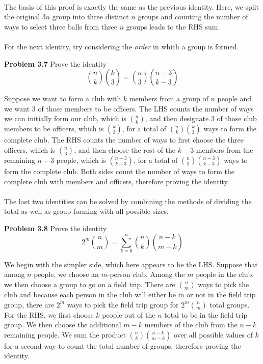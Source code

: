 \documentclass[11pt]{scrartcl}
\begin{document}
\\
\noindent
The basis of this proof is exactly the same as the previous identity. Here, we split the original $3n$ group into three distinct $n$ groups and counting the number of ways to select three balls from three $n$ groups leads to the RHS sum. \\
\\
\noindent 
For the next identity, try considering the \textit{order} in which a group is formed. 
\\
\begin{tcolorbox}
\textbf{Problem 3.7} Prove the identity
$${n \choose k}{k \choose 3}={n \choose 3}{n-3 \choose k-3}$$
\end{tcolorbox}
\noindent
Suppose we want to form a club with $k$ members from a group of $n$ people and we want 3 of those members to be officers. The LHS counts the number of ways we can initially form our club, which is ${{n \choose k}}$, and then designate 3 of those club members to be officers, which is ${{k \choose 3}}$, for a total of ${n \choose k}{k \choose 3}$ ways to form the complete club. The RHS counts the number of ways to first choose the three officers, which is $n \choose 3$, and then choose the rest of the $k-3$ members from the remaining $n-3$ people, which is ${{{n-3} \choose {k-3}}}$, for a total of ${n \choose 3}{n-3 \choose k-3}$ ways to form the complete club. Both sides count the number of ways to form the complete club with members and officers, therefore proving the identity. \\
\\
The last two identities can be solved by combining the methods of dividing the total as well as group forming with all possible sizes. 
\\
\begin{tcolorbox}
\textbf{Problem 3.8} Prove the identity 
$$2^m{n \choose m}=\sum_{k=0}^{n}{n \choose k}{{n-k} \choose {m-k}}$$
\end{tcolorbox}
\noindent 
We begin with the simpler side, which here appears to be the LHS. Suppose that among $n$ people, we choose an $m$-person club. Among the $m$ people in the club, we then choose a group to go on a field trip. There are ${n \choose m}$ ways to pick the club and because each person in the club will either be in or not in the field trip group, there are $2^m$ ways to pick the field trip group for ${2^m{n \choose m}}$ total groups. For the RHS, we first choose $k$ people out of the $n$ total to be in the field trip group. We then choose the additional $m-k$ members of the club from the $n-k$ remaining people. We sum the product ${n \choose k}{{n-k} \choose {m-k}}$ over all possible values of $k$ for a second way to count the total number of groups, therefore proving the identity. 
\end{document}
